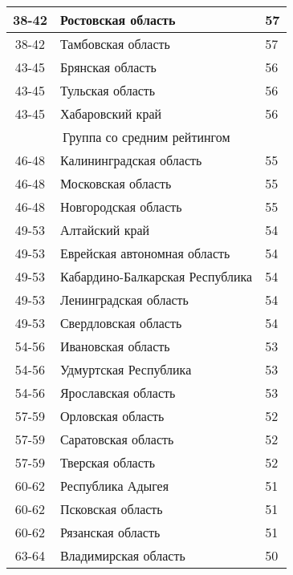 \begin{table}[p]
\begin{tabular}{|c|l|l|}
      38-42 & Ростовская область                & 57         \\ \hline
      38-42 & Тамбовская область                & 57         \\ \hline
      43-45 & Брянская область                  & 56         \\ \hline
      43-45 & Тульская область                  & 56         \\ \hline
      43-45 & Хабаровский край                  & 56         \\ \hline
      \multicolumn{3}{|c|}{Группа со средним рейтингом}      \\ \hline
      46-48 & Калининградская область           & 55         \\ \hline
      46-48 & Московская область                & 55         \\ \hline
      46-48 & Новгородская область              & 55         \\ \hline
      49-53 & Алтайский край                    & 54         \\ \hline
      49-53 & Еврейская автономная область      & 54         \\ \hline
      49-53 & Кабардино-Балкарская Республика   & 54         \\ \hline
      49-53 & Ленинградская область             & 54         \\ \hline
      49-53 & Свердловская область              & 54         \\ \hline
      54-56 & Ивановская область                & 53         \\ \hline
      54-56 & Удмуртская Республика             & 53         \\ \hline
      54-56 & Ярославская область               & 53         \\ \hline
      57-59 & Орловская область                 & 52         \\ \hline
      57-59 & Саратовская область               & 52         \\ \hline
      57-59 & Тверская область                  & 52         \\ \hline
      60-62 & Республика Адыгея                 & 51         \\ \hline
      60-62 & Псковская область                 & 51         \\ \hline
      60-62 & Рязанская область                 & 51         \\ \hline
      63-64 & Владимирская область              & 50         \\ \hline

\end{tabular}
\end{table}
